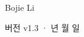 \begin{titlepage}
\vfill
{\LARGE\sffamily Bojie Li\par}
\vspace{0.7cm}
{\small\sffamily\color{structurecolor!80} 버전 v1.3 · \number\year 년 \number\month 월 \number\day 일\par}
\vspace{1.2cm}
\end{titlepage}

